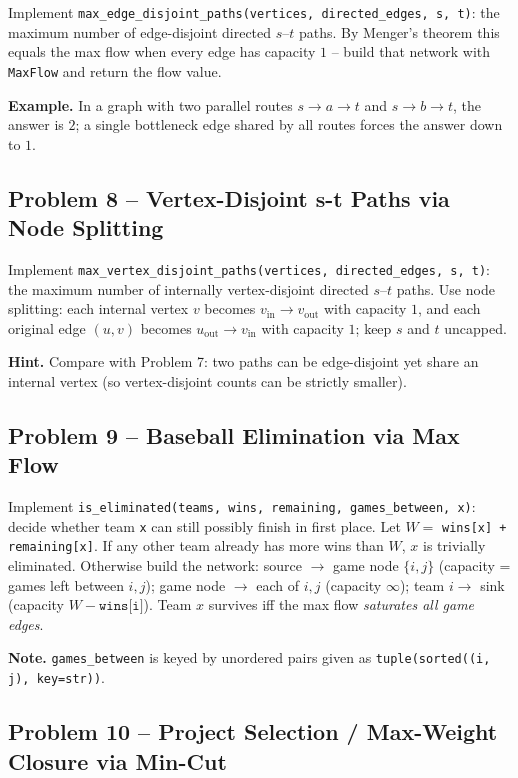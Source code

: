 \documentclass[11pt]{article}
\begin{document}
Implement \texttt{max\_edge\_disjoint\_paths(vertices, directed\_edges, s, t)}: the
maximum number of edge-disjoint directed $s$--$t$ paths. By Menger's theorem this equals
the max flow when every edge has capacity $1$ -- build that network with \texttt{MaxFlow}
and return the flow value.

\textbf{Example.} In a graph with two parallel routes $s\to a\to t$ and $s\to b\to t$,
the answer is $2$; a single bottleneck edge shared by all routes forces the answer down
to $1$.

\subsection*{Problem 8 -- Vertex-Disjoint s-t Paths via Node Splitting}

Implement \texttt{max\_vertex\_disjoint\_paths(vertices, directed\_edges, s, t)}: the
maximum number of internally vertex-disjoint directed $s$--$t$ paths. Use node splitting:
each internal vertex $v$ becomes $v_{\text{in}} \to v_{\text{out}}$ with capacity $1$, and
each original edge $(u,v)$ becomes $u_{\text{out}} \to v_{\text{in}}$ with capacity $1$;
keep $s$ and $t$ uncapped.

\textbf{Hint.} Compare with Problem 7: two paths can be edge-disjoint yet share an
internal vertex (so vertex-disjoint counts can be strictly smaller).

\subsection*{Problem 9 -- Baseball Elimination via Max Flow}

Implement \texttt{is\_eliminated(teams, wins, remaining, games\_between, x)}: decide
whether team \texttt{x} can still possibly finish in first place. Let $W = $
\texttt{wins[x] + remaining[x]}. If any other team already has more wins than $W$, $x$ is
trivially eliminated. Otherwise build the network: source $\to$ game node $\{i,j\}$
(capacity = games left between $i,j$); game node $\to$ each of $i,j$ (capacity $\infty$);
team $i \to$ sink (capacity $W - \texttt{wins[i]}$). Team $x$ survives iff the max flow
\emph{saturates all game edges}.

\textbf{Note.} \texttt{games\_between} is keyed by unordered pairs given as
\texttt{tuple(sorted((i, j), key=str))}.

\subsection*{Problem 10 -- Project Selection / Max-Weight Closure via Min-Cut}
\end{document}
